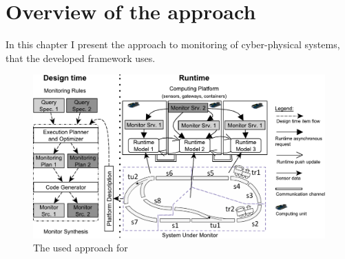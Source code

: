 
\chapter{Overview of the approach}


In this chapter I present the approach to monitoring of cyber-physical systems, that the developed framework uses. 


\begin{figure}[h]
	\begin{center}
		\includegraphics[width=\textwidth]{figures/fase-overview-crop.pdf}
	\end{center}
	\label{fig:approach}
	\caption{The used approach for }
\end{figure}



